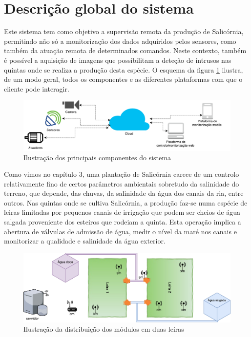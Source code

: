 \section{Descrição global do sistema}

Este sistema tem como objetivo a supervisão remota da produção de Salicórnia, permitindo não só a monitorização dos dados adquiridos pelos sensores, como também da atuação remota de determinados comandos. Neste contexto, também é possível a aquisição de imagens que possibilitam a deteção de intrusos nas quintas onde se realiza a produção desta espécie. O esquema da figura \ref{componentesalla} ilustra, de um modo geral, todos os componentes e as diferentes plataformas com que o cliente pode interagir. 


\begin{figure}[!htb]
	\centering
	\includegraphics[width=\linewidth]{esquemas/global_arquitetura.pdf}
	\caption{Ilustração dos principais componentes do sistema}
	\label{componentesalla}
\end{figure}


Como vimos no capítulo 3, uma plantação de  Salicórnia carece de um controlo relativamente fino de certos parâmetros ambientais sobretudo da salinidade do terreno, que depende, das chuvas, da salinidade da água dos canais da ria, entre outros. Nas quintas onde se cultiva Salicórnia, a produção faz-se numa espécie de leiras limitadas por pequenos canais de irrigação que podem ser cheios de água salgada proveniente dos esteiros que rodeiam a quinta. Esta operação implica a abertura de válvulas de admissão de água, medir o nível da maré nos canais e monitorizar a qualidade e salinidade da água exterior.

\begin{figure}[!htb]
	\centering
	\includegraphics[width=\linewidth]{esquemas/leiras-comm-geral.pdf}
	\caption{Ilustração da distribuição dos módulos em duas leiras}
	\label{leira}
\end{figure}


